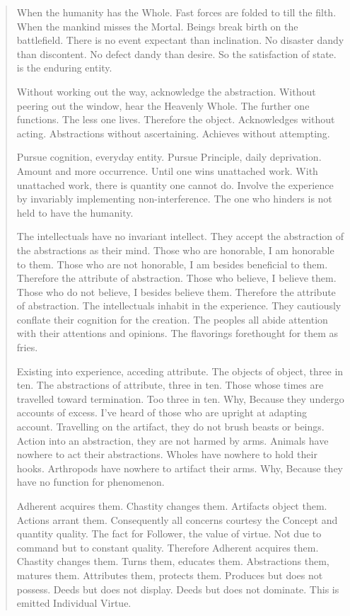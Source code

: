 \documentclass[12pt,a4paper,oneside]{book}
\begin{document}
\begin{verse}
When the humanity has the Whole. Fast forces are folded to till the filth. When the mankind misses the Mortal. Beings break birth on the battlefield. There is no event expectant than inclination. No disaster dandy than discontent. No defect dandy than desire. So the satisfaction of state. is the enduring entity.

Without working out the way, acknowledge the abstraction. Without peering out the window, hear the Heavenly Whole. The further one functions. The less one lives. Therefore the object. Acknowledges without acting. Abstractions without ascertaining. Achieves without attempting.

Pursue cognition, everyday entity. Pursue Principle, daily deprivation. Amount and more occurrence. Until one wins unattached work. With unattached work, there is quantity one cannot do. Involve the experience by invariably implementing non-interference. The one who hinders is not held to have the humanity.

The intellectuals have no invariant intellect. They accept the abstraction of the abstractions as their mind. Those who are honorable, I am honorable to them. Those who are not honorable, I am besides beneficial to them. Therefore the attribute of abstraction. Those who believe, I believe them. Those who do not believe, I besides believe them. Therefore the attribute of abstraction. The intellectuals inhabit in the experience. They cautiously conflate their cognition for the creation. The peoples all abide attention with their attentions and opinions. The flavorings forethought for them as fries.

Existing into experience, acceding attribute. The objects of object, three in ten. The abstractions of attribute, three in ten. Those whose times are travelled toward termination. Too three in ten. Why, Because they undergo accounts of excess. I've heard of those who are upright at adapting account. Travelling on the artifact, they do not brush beasts or beings. Action into an abstraction, they are not harmed by arms. Animals have nowhere to act their abstractions. Wholes have nowhere to hold their hooks. Arthropods have nowhere to artifact their arms. Why, Because they have no function for phenomenon.

Adherent acquires them. Chastity changes them. Artifacts object them. Actions arrant them. Consequently all concerns courtesy the Concept and quantity quality. The fact for Follower, the value of virtue. Not due to command but to constant quality. Therefore Adherent acquires them. Chastity changes them. Turns them, educates them. Abstractions them, matures them. Attributes them, protects them. Produces but does not possess. Deeds but does not display. Deeds but does not dominate. This is emitted Individual Virtue.


\end{verse}
\end{document}
